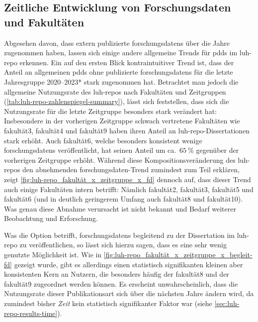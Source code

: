 \subsection{Zeitliche Entwicklung von Forschungsdaten und Fakultäten}
Abgesehen davon, dass extern publizierte \glspl{forschungsdaten} über die Jahre zugenommen haben, lassen sich einige andere allgemeine Trends für \glspl{pdd} im \gls{luh-repo} erkennen.
Ein auf den ersten Blick kontraintuitiver Trend ist, dass der Anteil an allgemeinen \glspl{pdd} ohne publizierte \glspl{forschungsdaten} für die letzte Jahresgruppe 2020--2023* stark zugenommen hat.
Betrachtet man jedoch die allgemeine Nutzungsrate des \gls{luh-repo}s nach Fakultäten und Zeitgruppen (\cref{tab:luh-repo-zahlenspiegel-summary}), lässt sich feststellen, dass sich die Nutzungsrate für die letzte Zeitgruppe besonders stark verändert hat:
Insbesondere in der vorherigen Zeitgruppe schwach vertretene Fakultäten wie \gls{fakultät3}, \gls{fakultät4} und \gls{fakultät9} haben ihren Anteil an \gls{luh-repo}-Dissertationen stark erhöht.
Auch \gls{fakultät6}, welche besonders konsistent wenige \glspl{forschungsdaten} veröffentlicht, hat seinen Anteil um ca.~$\SI{65}{\percent}$ gegenüber der vorherigen Zeitgruppe erhöht.
Während diese Kompositionsveränderung des \gls{luh-repo}s den abnehmenden \gls{forschungsdaten}-Trend zumindest zum Teil erklären, zeigt \cref{fig:luh-repo_fakultät_x_zeitgruppe_x_fd} dennoch auf, dass dieser Trend auch einige Fakultäten intern betrifft:
Nämlich \gls{fakultät2}, \gls{fakultät3}, \gls{fakultät5} und \gls{fakultät6} (und in deutlich geringerem Umfang auch \gls{fakultät8} und \gls{fakultät10}).
Was genau diese Abnahme verursacht ist nicht bekannt und Bedarf weiterer Beobachtung und Erforschung.

Was die Option betrifft, \glspl{forschungsdaten} begleitend zu der Dissertation im \gls{luh-repo} zu veröffentlichen, so lässt sich hierzu sagen, dass es eine sehr wenig genutzte Möglichkeit ist.
Wie in \cref{fig:luh-repo_fakultät_x_zeitgruppe_x_begleit-fd} gezeigt wurde, gibt es allerdings einen statistisch signifikanten kleinen aber konsistenten Kern an Nutzern, die besonders häufig der \gls{fakultät8} und der \gls{fakultät9} zugeordnet werden können.
Es erscheint unwahrscheinlich, dass die Nutzungsrate dieser Publikationsart sich über die nächsten Jahre ändern wird, da zumindest bisher \textit{Zeit} kein statistisch signifikanter Faktor war (siehe \cref{sec:luh-repo-results-time}).

